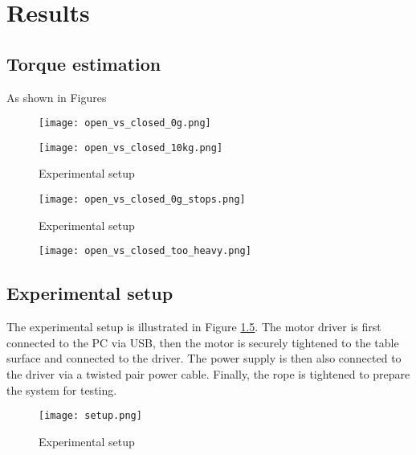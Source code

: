 \chapter{Results}

\section{Torque estimation}
As shown in Figures 
\begin{figure}[htbp]
  \centering
  \texttt{[image: open\_vs\_closed\_0g.png]}
  \caption{}
  \label{fig:ovc0g}
\end{figure}
\begin{figure}[htbp]
  \centering
  \texttt{[image: open\_vs\_closed\_10kg.png]}
  \caption{Experimental setup}
  \label{fig:ovc0g}
\end{figure}
\begin{figure}[htbp]
  \centering
  \texttt{[image: open\_vs\_closed\_0g\_stops.png]}
  \caption{Experimental setup}
  \label{fig:ovc0g}
\end{figure}
\begin{figure}[htbp]
  \centering
  \texttt{[image: open\_vs\_closed\_too\_heavy.png]}
  \caption{}
  \label{fig:ovc0g}
\end{figure}
\FloatBarrier

\section{Experimental setup}
The experimental setup is illustrated in Figure \ref{fig:setup}. The motor driver 
is first connected to the PC via USB, then the motor is securely tightened to the 
table surface and connected to the driver. The power supply is then also connected 
to the driver via a twisted pair power cable. Finally, the rope is tightened to 
prepare the system for testing.  

\begin{figure}[htbp]
  \centering
  \texttt{[image: setup.png]}
  \caption{Experimental setup}
  \label{fig:setup}
\end{figure}
\FloatBarrier

